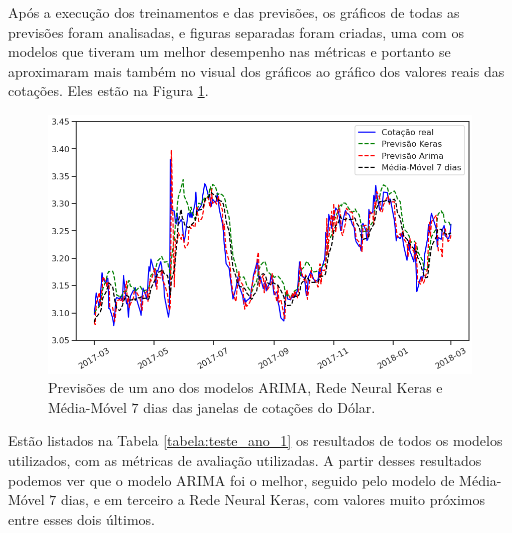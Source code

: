 Após a execução dos treinamentos e das previsões, os gráficos de todas as previsões foram analisadas, e figuras separadas foram criadas, uma com os modelos que tiveram um melhor desempenho nas métricas e portanto se aproximaram mais também no visual dos gráficos ao gráfico dos valores reais das cotações. Eles estão na Figura \ref{fig:previsoes_ano_1}.

\begin{figure}[htb]
\centering
\includegraphics[width=14cm]{figuras/series_previsoes_ano_1}
\caption{Previsões de um ano dos modelos ARIMA, Rede Neural Keras e Média-Móvel $7$ dias das janelas de cotações do Dólar.}
\label{fig:previsoes_ano_1}
\end{figure}

Estão listados na Tabela \ref{tabela:teste_ano_1} os resultados de todos os modelos utilizados, com as métricas de avaliação utilizadas. A partir desses resultados podemos ver que o modelo ARIMA foi o melhor, seguido pelo modelo de Média-Móvel $7$ dias, e em terceiro a Rede Neural Keras, com valores muito próximos entre esses dois últimos.

\begin{table}[]
\begin{center}
\caption{Métricas das previsões para um ano dos modelos das janelas de cotações do Dólar.}\label{tabela:teste_ano_1}
\end{center}
\end{table}

